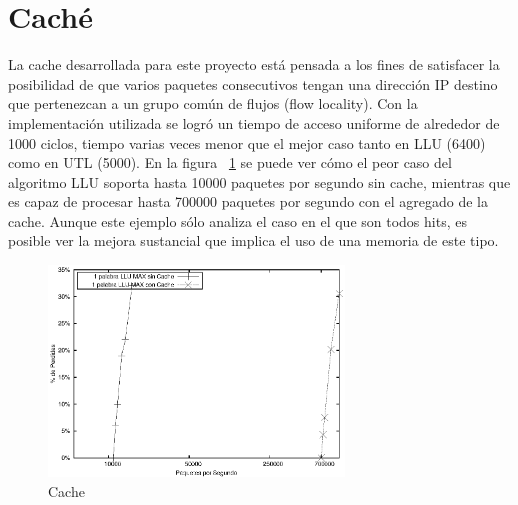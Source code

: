 \section{Caché}

La cache desarrollada para este proyecto está pensada a los fines de satisfacer la posibilidad de que varios paquetes consecutivos tengan una dirección IP destino que pertenezcan a un grupo común de flujos (flow locality). Con la implementación utilizada se logró un tiempo de acceso uniforme de alrededor de 1000 ciclos, tiempo varias veces menor que el mejor caso tanto en LLU (6400) como en UTL (5000). En la figura ~\ref{fig:cachecomp} se puede ver cómo el peor caso del algoritmo LLU soporta hasta 10000 paquetes por segundo sin cache, mientras que es capaz de procesar hasta 700000 paquetes por segundo con el agregado de la cache. Aunque este ejemplo sólo analiza el caso en el que son todos hits, es posible ver la mejora sustancial que implica el uso de una memoria de este tipo. 

\begin{figure}[!h]
  \centering
	\includegraphics[width=0.7\textwidth]{5-resultados/graf/cachecomp.eps}
  \caption{Cache }
  \label{fig:cachecomp}
\end{figure}

